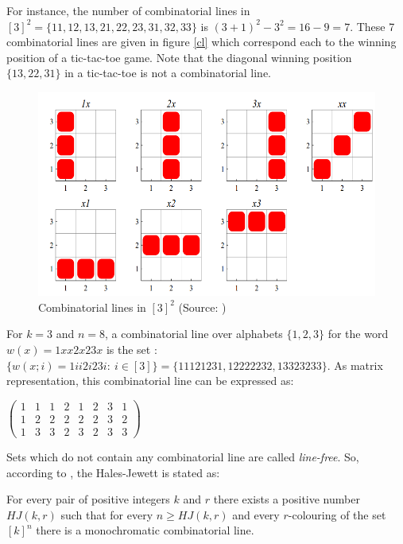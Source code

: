 For instance, the number of combinatorial lines in $[3]^2=\{11,12,13,21,22,23,31,32,33\}$ is $(3+1)^2-3^2=16-9=7.$ These 7 combinatorial lines are given in figure \eqref{cl} which correspond each to the winning position of a tic-tac-toe game. Note that the diagonal winning position $\{13, 22,31\}$ in a tic-tac-toe is not a combinatorial line.
\begin{figure}[hbtp]
\centering
\includegraphics[scale=0.3]{cblines.png}
\caption{Combinatorial lines in $[3]^2$ (Source: \cite{polymath2010density})} \label{cl}
\end{figure}

For $k=3$ and $n=8$, a combinatorial line over alphabets $\{1,2,3\}$ for the word  $w(x)=1xx2x23x$ is the set :
$\{w(x;i)=1ii2i23i: \ i\in [3]\}=  \{11121231, 12222232, 13323233 \}.$ As matrix representation, this combinatorial line can be expressed as:
\begin{center}
$\left(\begin{array}{cccccccc}
1 & 1 & 1 & 2 & 1 & 2& 3 &1\\  1 & 2 & 2 & 2 & 2 & 2 & 3 & 2\\ 1 & 3 & 3 & 2 & 3 & 2 & 3 & 3 
\end{array}  \right)$
\end{center}


Sets which do not contain any combinatorial line are called  \textit{line-free}.  So, according to \cite{polymath2012new}, the Hales-Jewett is stated as:

\begin{thm}   For every pair of positive integers $k$ and $r$ there exists a positive number $HJ(k, r)$ such that for every $n \geq HJ(k, r)$ and every $r$-colouring of the set $[k]^n$ there is a
monochromatic combinatorial line.   \label{hj1} 	\end{thm}

